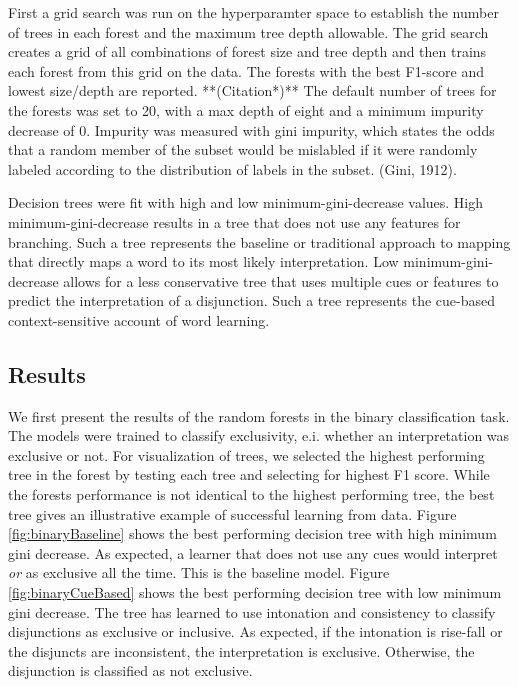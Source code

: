 \documentclass[,man,floatsintext]{apa6}
\begin{document}
First a grid search was run on the hyperparamter space to establish the number of trees in each forest and the maximum tree depth allowable. The grid search creates a grid of all combinations of forest size and tree depth and then trains each forest from this grid on the data. The forests with the best F1-score and lowest size/depth are reported. **(Citation*)** The default number of trees for the forests was set to 20, with a max depth of eight and a minimum impurity decrease of 0. Impurity was measured with gini impurity, which states the odds that a random member of the subset would be mislabled if it were randomly labeled according to the distribution of labels in the subset. (Gini, 1912).

Decision trees were fit with high and low minimum-gini-decrease values. High minimum-gini-decrease results in a tree that does not use any features for branching. Such a tree represents the baseline or traditional approach to mapping that directly maps a word to its most likely interpretation. Low minimum-gini-decrease allows for a less conservative tree that uses multiple cues or features to predict the interpretation of a disjunction. Such a tree represents the cue-based context-sensitive account of word learning.

\hypertarget{results-1}{%
\subsection{Results}\label{results-1}}

We first present the results of the random forests in the binary classification task. The models were trained to classify exclusivity, e.i. whether an interpretation was exclusive or not. For visualization of trees, we selected the highest performing tree in the forest by testing each tree and selecting for highest F1 score. While the forests performance is not identical to the highest performing tree, the best tree gives an illustrative example of successful learning from data. Figure \ref{fig:binaryBaseline} shows the best performing decision tree with high minimum gini decrease. As expected, a learner that does not use any cues would interpret \emph{or} as exclusive all the time. This is the baseline model. Figure \ref{fig:binaryCueBased} shows the best performing decision tree with low minimum gini decrease. The tree has learned to use intonation and consistency to classify disjunctions as exclusive or inclusive. As expected, if the intonation is rise-fall or the disjuncts are inconsistent, the interpretation is exclusive. Otherwise, the disjunction is classified as not exclusive.
\end{document}
